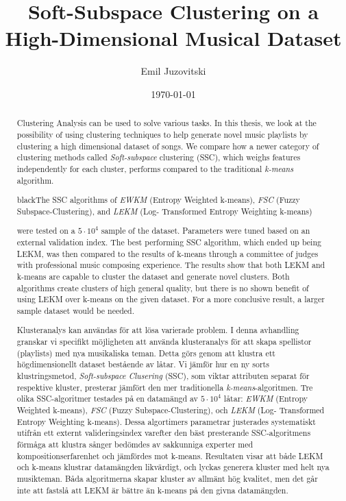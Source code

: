 \documentclass[master]{kththesis}
\title{Soft-Subspace Clustering on a High-Dimensional Musical Dataset}
\author{Emil Juzovitski}
\date{\today}
\begin{document}
\frontmatter

\titlepage

\begin{abstract}
Clustering Analysis can be used to solve various tasks. In this thesis, we look at the possibility of using clustering techniques to help generate novel music playlists by clustering a high dimensional dataset of songs. We compare how a newer category of clustering methods called \textit{Soft-subspace} clustering (SSC), which weighs features independently for each cluster, performs compared to the traditional \textit{k-means} algorithm. \begin{color}{black}{The SSC algorithms of \textit{EWKM} (Entropy Weighted k-means), \textit{FSC} (Fuzzy Subspace-Clustering), and \textit{LEKM} (Log- Transformed Entropy Weighting k-means)}\end{color} were tested on a $5 \cdot 10^4$ sample of the dataset. Parameters were tuned based on an external validation index. The best performing SSC algorithm, which ended up being LEKM, was then compared to the results of k-means through a committee of judges with professional music composing experience. The results show that both LEKM and k-means are capable to cluster the dataset and generate novel clusters. Both algorithms create clusters of high general quality, but there is no shown benefit of using LEKM over k-means on the given dataset. For a more conclusive result, a larger sample dataset would be needed.
\end{abstract}


\begin{otherlanguage}{swedish}
  \begin{abstract}
  Klusteranalys kan användas för att lösa varierade problem. I denna avhandling granskar vi specifikt möjligheten att använda klusteranalys för att skapa spellistor (playlists) med nya musikaliska teman. Detta görs genom att klustra ett högdimensionellt dataset bestående av låtar. Vi jämför hur en ny sorts klustringsmetod, \textit{Soft-subspace Clusering} (SSC), som viktar attributen separat för respektive kluster, presterar jämfört den mer traditionella \textit{k-means}-algoritmen. Tre olika SSC-algoritmer testades på en datamängd av $5 \cdot 10^4$ låtar: \textit{EWKM} (Entropy Weighted k-means), \textit{FSC} (Fuzzy Subspace-Clustering), och \textit{LEKM} (Log- Transformed Entropy Weighting k-means). Dessa algortimers parametrar justerades systematiskt utifrån ett externt valideringsindex varefter den bäst presterande SSC-algoritmens förmåga att klustra sånger bedömdes av sakkunniga experter med kompositionserfarenhet och jämfördes mot k-means. Resultaten visar att både LEKM och k-means klustrar datamängden likvärdigt, och lyckas generera kluster med helt nya musikteman. Båda algoritmerna skapar kluster av allmänt hög kvalitet, men det går inte att fastslå att LEKM är bättre än k-means på den givna datamängden.
  \end{abstract}
\end{otherlanguage}
\end{document}
